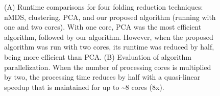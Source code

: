 \documentclass[twocolumn]{bmcart}%
\begin{document}
\begin{backmatter}
\begin{figure}[th]
\caption{ (A) Runtime comparisons for four folding reduction techniques: nMDS, clustering, PCA, and our proposed algorithm (running with one and two cores). With one core, PCA was the most efficient algorithm, followed by our algorithm. However, when the proposed algorithm was run with two cores, its runtime was reduced by half, being more efficient than PCA. (B) Evaluation of algorithm parallelization. When the number of processing cores is multiplied by two, the processing time reduces by half with a quasi-linear speedup that is maintained for up to \textasciitilde{}8 cores (8x). \label{fig:Performance-methods}}
\end{figure}





\end{backmatter}
\end{document}
